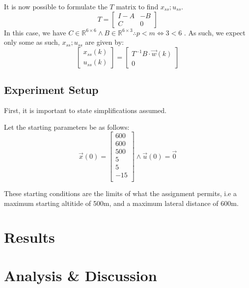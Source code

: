 \documentclass[conference, tikz]{IEEEtran}
\begin{document}
It is now possible to formulate the $T$ matrix to find $x_{ss};u_{ss}$.
\[
    T = 
    \begin{bmatrix}
        I-A & -B\\
        C & 0
    \end{bmatrix}
\]
In this case, we have $C \in \mathbb{R}^{6 \times 6} \land B \in \mathbb{R}^{6 \times 3} \therefore p < m \iff 3 < 6$ . 
As such, we expect only some 
as such, $x_{ss};u_{ss}$ are given by:
\[
    \begin{bmatrix}
        x_{ss}(k)\\
        u_{ss}(k)
    \end{bmatrix}
    =
    \begin{bmatrix}
        T^{-1}B\cdot \vec w(k)\\

        0
    \end{bmatrix}

\]


\subsection{Experiment Setup}
First, it is important to state simplifications assumed. 

Let the starting parameters be as follows:
\[
    \vec x(0)
        =
        \begin{bmatrix}
            600\\
            600\\
            500\\
            5\\
            5\\
            -15\\
        \end{bmatrix}
        \land
        \vec u(0)
        = \vec 0
        
\]

These starting conditions are the limits of what the assignment permits, i.e a maximum starting altitide of 500m, and a maximum lateral distance of 600m.


\section{Results}

\section{Analysis \& Discussion}
\end{document}
